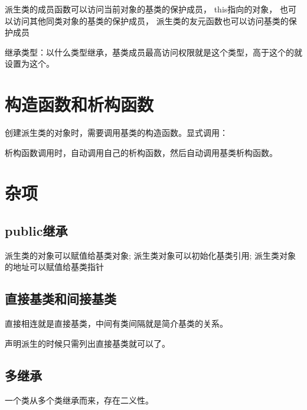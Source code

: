 \documentclass[UTF8]{ctexart}
\begin{document}
派生类的成员函数可以访问当前对象的基类的保护成员，
this指向的对象，
也可以访问其他同类对象的基类的保护成员，
派生类的友元函数也可以访问基类的保护成员

继承类型：以什么类型继承，基类成员最高访问权限就是这个类型，高于这个的就设置为这个。

\section{构造函数和析构函数}
创建派生类的对象时，需要调用基类的构造函数。显式调用：

析构函数调用时，自动调用自己的析构函数，然后自动调用基类析构函数。

\section{杂项}
\subsection{public继承}
派生类的对象可以赋值给基类对象;
派生类对象可以初始化基类引用;
派生类对象的地址可以赋值给基类指针

\subsection{直接基类和间接基类}
直接相连就是直接基类，中间有类间隔就是简介基类的关系。

声明派生的时候只需列出直接基类就可以了。

\subsection{多继承}
一个类从多个类继承而来，存在二义性。
\end{document}
